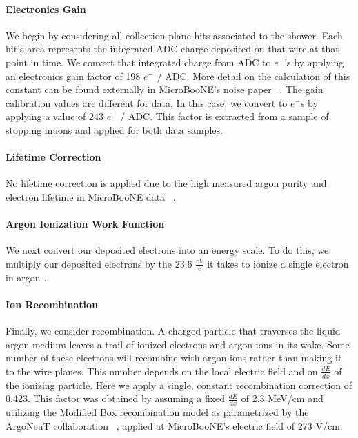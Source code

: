 \paragraph{Electronics Gain} 
We begin by considering all collection plane hits associated to the shower.  Each hit's area represents the integrated ADC charge deposited on that wire at that point in time.  We convert that integrated charge from ADC to $e^-$'s by applying an electronics gain factor of 198 $e^-$ / ADC. More detail on the calculation of this constant can be found externally in MicroBooNE's noise paper ~\cite{bib:noise}.  
\noindent The gain calibration values are different for data. In this case, we convert to $e^-$s by applying a value of 243 $e^-$ / ADC.  This factor is extracted from a sample of stopping muons and applied for both data samples.   
\paragraph{ Lifetime Correction} No lifetime correction is applied due to the high measured argon purity and electron lifetime in MicroBooNE data ~\cite{bib:purity}. 
\paragraph{Argon Ionization Work Function} We next convert our deposited electrons into an energy scale. To do this, we multiply our deposited electrons by the 23.6 $\frac{eV}{e}$ it takes to ionize a single electron in argon \cite{bib:ionization_per_electron}. 
\paragraph{Ion Recombination} Finally, we consider recombination.  A charged particle that traverses the liquid argon medium leaves a trail of ionized electrons and argon ions in its wake.  Some number of these electrons will recombine with argon ions rather than making it to the wire planes. This number depends on the local electric field and on $\frac{dE}{dx}$ of the ionizing particle. Here we apply a single, constant recombination correction of 0.423. This factor was obtained by assuming a fixed $\frac{dE}{dx}$ of 2.3 MeV/cm  and utilizing the Modified Box recombination model as parametrized by the ArgoNeuT collaboration ~\cite{bib:argoneut_recomb}, applied at MicroBooNE's electric field of 273 V/cm.  
